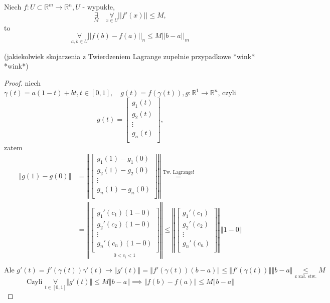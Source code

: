 \documentclass[../main.tex]{subfiles}
\begin{document}
\pagebreak
\begin{stw}
    Niech $f: U\subset \mathbb{R}^m \to \mathbb{R}^n, U$ - wypukłe,
    \[
        \underset{M}{\exists}\quad \underset{x\in U}{\forall}||f'(x)||\leq M
    ,\]
to
    \[
        \underset{a,b\in U}{\forall}||f(b)-f(a)||_n \leq M||b-a||_m
    \] \begin{tiny}(jakiekolwiek skojarzenia z Twierdzeniem Lagrange zupełnie przypadkowe *wink* *wink*)\end{tiny}
\end{stw}

\begin{proof}

niech $\gamma (t) = a(1-t) + bt, t\in [0,1], \quad g(t) = f(\gamma (t)),g: \mathbb{R}^1 \to \mathbb{R}^n$,
czyli
\[
    g(t) = \left [ \begin{matrix}
    g_1(t)\\
    g_2(t)\\
    \vdots\\
    g_n(t)\\ \end{matrix}\right ]
,\]
zatem
    \begin{align*}
        \left \Vert g(1)-g(0)\right \Vert &= \left \Vert \left [ \begin{matrix}
    g_1(1) - g_1(0)\\
    g_2(1) - g_2(0)\\
    \vdots\\
    g_n(1) - g_n(0)\\ \end{matrix}\right ] \right \Vert \overset{\text{Tw. Lagrange!}}{=}\\
        &=\left\Vert \underset{0<c_i<1}{\left [ \begin{matrix}
    g_1'(c_1)(1-0)\\
    g_2'(c_2)(1-0)\\
    \vdots\\
        g_n'(c_n)(1-0)\\ \end{matrix}\right ]}\right\Vert \leq \left\Vert \left [ \begin{matrix}
    g_1'(c_1)\\
    g_2'(c_2)\\
    \vdots\\
    g_n'(c_n)\\ \end{matrix}\right ] \right\Vert \left\Vert 1 - 0 \right\Vert
    \end{align*}

\[
    \text{Ale } g'(t) = f'(\gamma(t))\gamma'(t) \to \left\Vert g'(t)\right\Vert = \left\Vert f'(\gamma(t))(b-a)\right\Vert \leq \left\Vert f'(\gamma(t))\right\Vert \left\Vert b-a \right\Vert \underset{\text{z zał. stw.}}{\leq} M
\]
\[
    \text{Czyli }\underset{t\in[0,1]}{\forall}\left\Vert g'(t) \right\Vert \leq M\left\Vert b-a \right\Vert \implies \left\Vert f(b) - f(a) \right\Vert \leq M \left\Vert b - a \right\Vert
\]
\end{proof}
\end{document}
